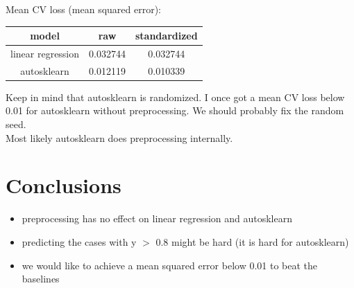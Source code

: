 \documentclass[a4paper,10pt]{article}
\begin{document}
Mean CV loss (mean squared error):

\vspace{0.5cm}
\begin{tabular}{|c|c|c|}
 \hline
 model & raw & standardized \\
 \hline
 linear regression & 0.032744 & 0.032744 \\
 autosklearn & 0.012119 & 0.010339 \\
 \hline
\end{tabular}

\vspace{0.5cm}
Keep in mind that autosklearn is randomized.
I once got a mean CV loss below 0.01 for autosklearn without preprocessing.
We should probably fix the random seed.\\
Most likely autosklearn does preprocessing internally.


\section{Conclusions}

\begin{itemize}
 \item preprocessing has no effect on linear regression and autosklearn
 \item predicting the cases with y $>$ 0.8 might be hard (it is hard for autosklearn)
 \item we would like to achieve a mean squared error below 0.01 to beat the baselines
\end{itemize}
\end{document}
